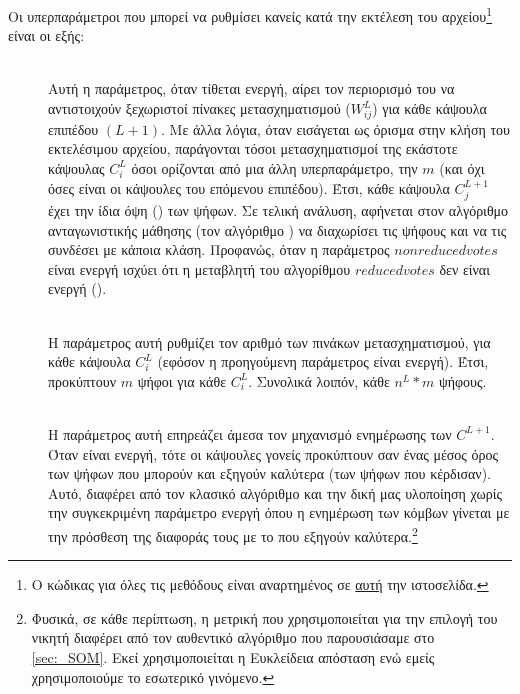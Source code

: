 Οι υπερπαράμετροι που μπορεί να ρυθμίσει κανείς κατά την εκτέλεση του αρχείου\footnote{Ο κώδικας για όλες τις μεθόδους είναι αναρτημένος σε \href{https://github.com/abarmper/Capsule_Nets_with_uncertainty}{αυτή} την ιστοσελίδα.} είναι οι εξής:


\begin{description}
  \item[] \hfill \\ Αυτή η παράμετρος, όταν τίθεται ενεργή, αίρει τον περιορισμό του να αντιστοιχούν ξεχωριστοί πίνακες μετασχηματισμού ($W_{ij}^L$) για κάθε κάψουλα επιπέδου $(L+1)$. Με άλλα λόγια, όταν εισάγεται ως όρισμα στην κλήση του εκτελέσιμου αρχείου, παράγονται τόσοι μετασχηματισμοί της εκάστοτε κάψουλας $C_i^L$ όσοι ορίζονται από μια άλλη υπερπαράμετρο, την $m$ (και όχι όσες είναι οι κάψουλες του επόμενου επιπέδου). Έτσι, κάθε κάψουλα $C^{L+1}_j$ έχει την ίδια όψη () των ψήφων. Σε τελική ανάλυση, αφήνεται στον αλγόριθμο ανταγωνιστικής μάθησης (τον αλγόριθμο ) να διαχωρίσει τις ψήφους και να τις συνδέσει με κάποια κλάση. Προφανώς, όταν η παράμετρος $non reduced votes$ είναι ενεργή ισχύει ότι η μεταβλητή του αλγορίθμου $reduced votes$ δεν είναι ενεργή ().
  
  \item[] \hfill \\ Η παράμετρος αυτή ρυθμίζει τον αριθμό των πινάκων μετασχηματισμού, για κάθε κάψουλα $C_i^L$ (εφόσον η προηγούμενη παράμετρος είναι ενεργή). Έτσι, προκύπτουν $m$ ψήφοι για κάθε $C_i^L$. Συνολικά λοιπόν, κάθε   $n^L \ast m$ ψήφους.
  
  \item[] \hfill \\ Η παράμετρος αυτή επηρεάζει άμεσα τον μηχανισμό ενημέρωσης των $C^{L+1}$. Όταν είναι ενεργή, τότε οι κάψουλες γονείς προκύπτουν σαν ένας μέσος όρος των ψήφων που μπορούν και εξηγούν καλύτερα (των ψήφων που κέρδισαν). Αυτό, διαφέρει από τον κλασικό αλγόριθμο  και την δική μας υλοποίηση χωρίς την συγκεκριμένη παράμετρο ενεργή όπου η ενημέρωση των κόμβων γίνεται με την πρόσθεση της διαφοράς τους με το  που εξηγούν καλύτερα.\footnote{Φυσικά, σε κάθε περίπτωση, η μετρική που χρησιμοποιείται για την επιλογή του νικητή διαφέρει από τον αυθεντικό αλγόριθμο που παρουσιάσαμε στο \ref{sec:_SOM}. Εκεί χρησιμοποιείται η Ευκλείδεια απόσταση ενώ εμείς χρησιμοποιούμε το εσωτερικό γινόμενο.}
  

\end{description}
